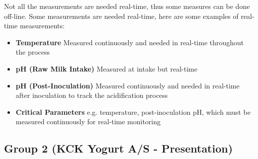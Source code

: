 Not all the measurements are needed real-time, thus some measures can be done off-line. Some measurements are needed real-time, here are some examples of real-time measurements:
\begin{highlight}
    \begin{itemize}
        \item \textbf{Temperature}
        \subitem Measured continuously and needed in real-time throughout the process
        \item \textbf{pH (Raw Milk Intake)}
        \subitem Measured at intake but real-time
        \item \textbf{pH (Post-Inoculation)}
        \subitem Measured continuously and needed in real-time after inoculation to track the acidification process
        \item \textbf{Critical Parameters}
        \subitem e.g. temperature, post-inoculation pH, which must be measured continuously for real-time monitoring
    \end{itemize}
\end{highlight}

\subsection{Group 2 (KCK Yogurt A/S - Presentation)}